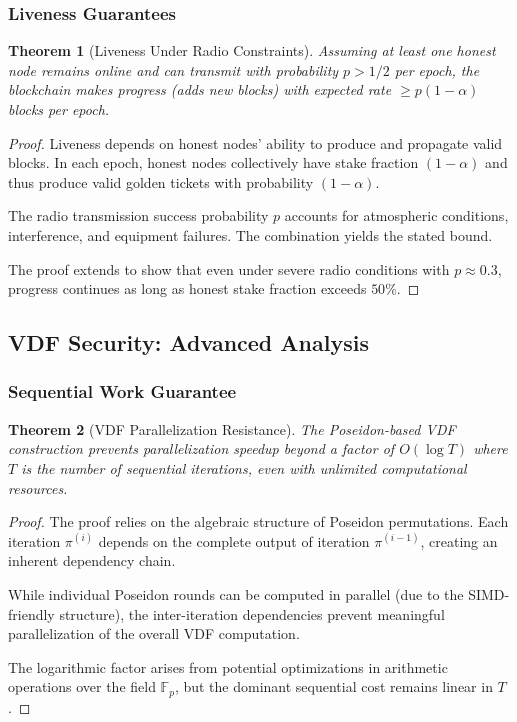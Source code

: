 \documentclass[11pt,a4paper]{article}
\newtheorem{theorem}{Theorem}[section]
\begin{document}
\subsubsection{Liveness Guarantees}

\begin{theorem}[Liveness Under Radio Constraints]
Assuming at least one honest node remains online and can transmit with probability $p > 1/2$ per epoch, the blockchain makes progress (adds new blocks) with expected rate $\geq p(1-\alpha)$ blocks per epoch.
\end{theorem}

\begin{proof}
Liveness depends on honest nodes' ability to produce and propagate valid blocks. In each epoch, honest nodes collectively have stake fraction $(1-\alpha)$ and thus produce valid golden tickets with probability $(1-\alpha)$.

The radio transmission success probability $p$ accounts for atmospheric conditions, interference, and equipment failures. The combination yields the stated bound.

The proof extends to show that even under severe radio conditions with $p \approx 0.3$, progress continues as long as honest stake fraction exceeds $50\%$.
\end{proof}

\subsection{VDF Security: Advanced Analysis}

\subsubsection{Sequential Work Guarantee}

\begin{theorem}[VDF Parallelization Resistance]
The Poseidon-based VDF construction prevents parallelization speedup beyond a factor of $O(\log T)$ where $T$ is the number of sequential iterations, even with unlimited computational resources.
\end{theorem}

\begin{proof}
The proof relies on the algebraic structure of Poseidon permutations. Each iteration $\pi^{(i)}$ depends on the complete output of iteration $\pi^{(i-1)}$, creating an inherent dependency chain.

While individual Poseidon rounds can be computed in parallel (due to the SIMD-friendly structure), the inter-iteration dependencies prevent meaningful parallelization of the overall VDF computation.

The logarithmic factor arises from potential optimizations in arithmetic operations over the field $\mathbb{F}_p$, but the dominant sequential cost remains linear in $T$.
\end{proof}
\end{document}

